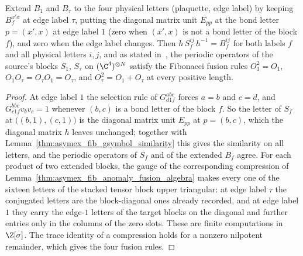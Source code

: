 \begin{lemma}
    Extend $B_1$ and $B_\tau$ to the four physical letters (plaquette, edge
    label) by keeping $B_f^{x'x}$ at edge label $\tau$, putting the diagonal
    matrix unit $E_{pp}$ at the bond letter $p=(x',x)$ at edge label $1$
    (zero when $(x',x)$ is not a bond letter of the block $f$), and zero when
    the edge label changes. Then $h\,S_f^{ij}\,h^{-1}=B_f^{ij}$ for both
    labels $f$ and all physical letters $i,j$, and as stated
    in~\cite[Appendix~D.1]{Bultinck2017Anyons}, the periodic operators of
    the source's blocks $S_1$, $S_\tau$ on $(\C^4)^{\otimes N}$ satisfy
    the Fibonacci fusion rules $O_1^2=O_1$,
    $O_1O_\tau=O_\tau O_1=O_\tau$, and $O_\tau^2=O_1+O_\tau$ at every
    positive length.
\end{lemma}

\begin{proof}
    \leanok
    At edge label $1$ the selection rule of $G^{abc}_{d1f}$ forces $a=b$ and
    $c=d$, and $G^{bbc}_{c1f}v_bv_c=1$ whenever $(b,c)$ is a bond letter of
    the block $f$. So the letter of $S_f$ at $\bigl((b,1),(c,1)\bigr)$ is the
    diagonal matrix unit $E_{pp}$ at $p=(b,c)$, which the diagonal matrix $h$
    leaves unchanged; together with
    Lemma~\ref{thm:asymex_fib_gsymbol_similarity} this gives the similarity
    on all letters, and the periodic operators of $S_f$ and of the extended
    $B_f$ agree. For each product of two extended blocks, the gauge of the
    corresponding compression of
    Lemma~\ref{thm:asymex_fib_anomaly_fusion_algebra} makes every one of the
    sixteen letters of the stacked tensor block upper triangular: at edge
    label $\tau$ the conjugated letters are the block-diagonal ones already
    recorded, and at edge label $1$ they carry the edge-$1$ letters of the
    target blocks on the diagonal and further entries only in the columns of
    the zero slots. These are finite computations in $\Z[\sigma]$. The trace
    identity of a compression holds for a nonzero nilpotent remainder, which
    gives the four fusion rules.
\end{proof}

